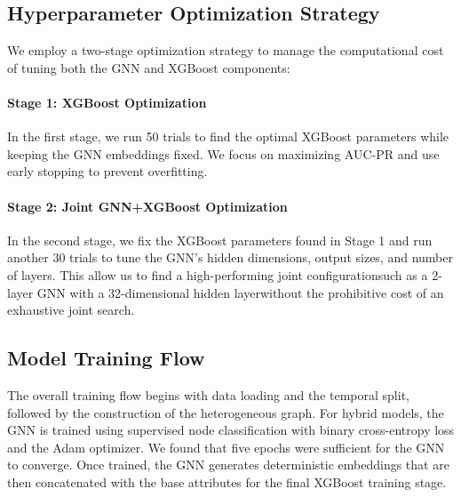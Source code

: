 \subsection{Hyperparameter Optimization Strategy}

We employ a two-stage optimization strategy to manage the computational cost of tuning both the GNN and XGBoost components:

\paragraph{Stage 1: XGBoost Optimization}
In the first stage, we run 50 trials to find the optimal XGBoost parameters while keeping the GNN embeddings fixed. We focus on maximizing AUC-PR and use early stopping to prevent overfitting.

\paragraph{Stage 2: Joint GNN+XGBoost Optimization}
In the second stage, we fix the XGBoost parameters found in Stage 1 and run another 30 trials to tune the GNN's hidden dimensions, output sizes, and number of layers. This allow us to find a high-performing joint configurationsuch as a 2-layer GNN with a 32-dimensional hidden layerwithout the prohibitive cost of an exhaustive joint search.

\subsection{Model Training Flow}

The overall training flow begins with data loading and the temporal split, followed by the construction of the heterogeneous graph. For hybrid models, the GNN is trained using supervised node classification with binary cross-entropy loss and the Adam optimizer. We found that five epochs were sufficient for the GNN to converge. Once trained, the GNN generates deterministic embeddings that are then concatenated with the base attributes for the final XGBoost training stage.
